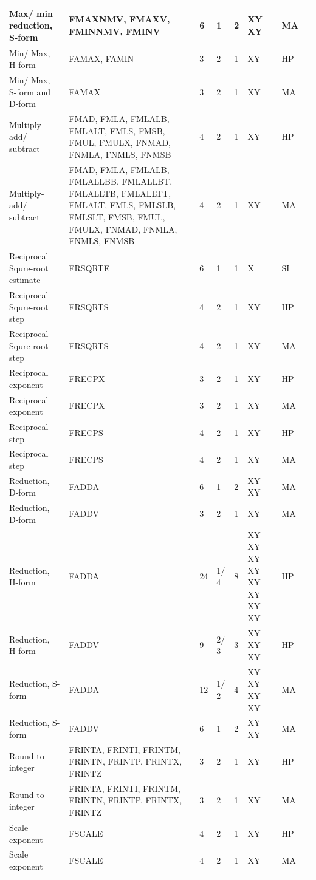 \begin{longtable}{|p{1in}|p{1in}|l|l|l|p{1in}|l|p{1in}|}
\hline
Max/ min reduction, S-form & FMAXNMV, FMAXV, FMINNMV, FMINV & 6 & 1 & 2 & XY XY & MA & \\
\hline
Min/ Max, H-form & FAMAX, FAMIN & 3 & 2 & 1 & XY & HP & \\
\hline
Min/ Max, S-form and D-form & FAMAX & 3 & 2 & 1 & XY & MA & \\
\hline
Multiply-add/ subtract & FMAD, FMLA, FMLALB, FMLALT, FMLS, FMSB, FMUL, FMULX, FNMAD, FNMLA, FNMLS, FNMSB & 4 & 2 & 1 & XY & HP & \\
\hline
Multiply-add/ subtract & FMAD, FMLA, FMLALB, FMLALLBB, FMLALLBT, FMLALLTB, FMLALLTT, FMLALT, FMLS, FMLSLB, FMLSLT, FMSB, FMUL, FMULX, FNMAD, FNMLA, FNMLS, FNMSB & 4 & 2 & 1 & XY & MA & \\
\hline
Reciprocal Squre-root estimate & FRSQRTE & 6 & 1 & 1 & X & SI & \\
\hline
Reciprocal Squre-root step & FRSQRTS & 4 & 2 & 1 & XY & HP & \\
\hline
Reciprocal Squre-root step & FRSQRTS & 4 & 2 & 1 & XY & MA & \\
\hline
Reciprocal exponent & FRECPX & 3 & 2 & 1 & XY & HP & \\
\hline
Reciprocal exponent & FRECPX & 3 & 2 & 1 & XY & MA & \\
\hline
Reciprocal step & FRECPS & 4 & 2 & 1 & XY & HP & \\
\hline
Reciprocal step & FRECPS & 4 & 2 & 1 & XY & MA & \\
\hline
Reduction, D-form & FADDA & 6 & 1 & 2 & XY XY & MA & \\
\hline
Reduction, D-form & FADDV & 3 & 2 & 1 & XY & MA & \\
\hline
Reduction, H-form & FADDA & 24 & 1/ 4 & 8 & XY XY XY XY XY XY XY XY & HP & \\
\hline
Reduction, H-form & FADDV & 9 & 2/ 3 & 3 & XY XY XY & HP & \\
\hline
Reduction, S-form & FADDA & 12 & 1/ 2 & 4 & XY XY XY XY & MA & \\
\hline
Reduction, S-form & FADDV & 6 & 1 & 2 & XY XY & MA & \\
\hline
Round to integer & FRINTA, FRINTI, FRINTM, FRINTN, FRINTP, FRINTX, FRINTZ & 3 & 2 & 1 & XY & HP & \\
\hline
Round to integer & FRINTA, FRINTI, FRINTM, FRINTN, FRINTP, FRINTX, FRINTZ & 3 & 2 & 1 & XY & MA & \\
\hline
Scale exponent & FSCALE & 4 & 2 & 1 & XY & HP & \\
\hline
Scale exponent & FSCALE & 4 & 2 & 1 & XY & MA & \\

\end{longtable}
